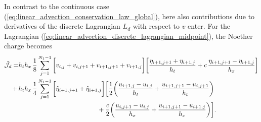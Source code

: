 \documentclass[12pt,a4paper,reqno]{article}
\begin{document}
\endgroup
In contrast to the continuous case (\ref{eq:linear_advection_conservation_law_global}), here also contributions due to derivatives of the discrete Lagrangian $L_{d}$ with respect to $v$ enter.
For the Lagrangian (\ref{eq:linear_advection_discrete_lagrangian_midpoint}), the Noether charge becomes
\begin{align}\label{eq:linear_advection_discrete_conservation_law_2}
\nonumber
\tilde{\mathcal{J}}_{d} =& h_{t} h_{x} \, \dfrac{1}{8} \sum \limits_{j=1}^{N_{1}-1} \bigg[ v_{i,j} + v_{i,j+1} + v_{i+1,j+1} + v_{i+1,j} \bigg] \bigg[ \dfrac{\eta_{i+1, j+1} + \eta_{i+1, j}}{h_{t}} + c \, \dfrac{\eta_{i+1,j+1} - \eta_{i+1,  j}}{h_{x}} \bigg] \\
\nonumber
+ \,
& h_{t} h_{x} \, \dfrac{1}{4} \sum \limits_{j=1}^{N_{1}-1} \bigg[ \tilde{\eta}_{i+1,j+1} + \tilde{\eta}_{i+1,j} \bigg] \bigg[
  \dfrac{1}{2} \bigg( \dfrac{u_{i+1,j} - u_{i,j}}{h_{t}} + \dfrac{u_{i+1,j+1} - u_{i,j+1}}{h_{t}} \bigg) \\
&\hspace{12.3em}
+ \dfrac{c}{2} \bigg( \dfrac{u_{i,j+1} - u_{i,j}}{h_{x}} + \dfrac{u_{i+1,j+1} - u_{i+1,j}}{h_{x}} \bigg)
\bigg] .
\end{align}
\end{document}
